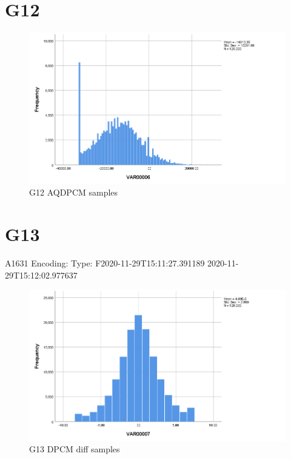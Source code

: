 \documentclass[hidelinks, 12pt, a4paper]{article}
\begin{document}
\section{G12}

\begin{figure}[h!]
	\centering
		\includegraphics[height=.38\textheight, width=\textwidth]{assets/session2/g12.png}
		\caption{G12 AQDPCM  samples}
	\end{figure}

\section{G13}
A1631
Encoding: 
Type: F2020-11-29T15:11:27.391189
2020-11-29T15:12:02.977637
\begin{figure}[h!]
	\centering
		\includegraphics[height=.38\textheight, width=\textwidth]{assets/session2/g13.png}
		\caption{G13 DPCM diff samples}
	\end{figure}
\end{document}
